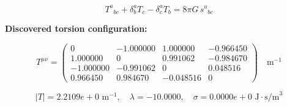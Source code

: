 
\begin{equation}
  T^a{}_{bc} + \delta^a_b T_c - \delta^a_c T_b = 8\pi G \, s^a{}_{bc}
\end{equation}

\textbf{Discovered torsion configuration:}

\begin{equation}
  T^{\mu\nu} = \begin{pmatrix}
    0 & -1.000000 & 1.000000 & -0.966450 \\
    1.000000 & 0 & 0.991062 & -0.984670 \\
    -1.000000 & -0.991062 & 0 & 0.048516 \\
    0.966450 & 0.984670 & -0.048516 & 0
  \end{pmatrix} \quad \text{m}^{-1}
\end{equation}

\begin{equation}
  |T| = 2.2109e+0 \text{ m}^{-1}, \quad
  \lambda = -10.0000, \quad
  \sigma = 0.0000e+0 \text{ J}\cdot\text{s/m}^3
\end{equation}